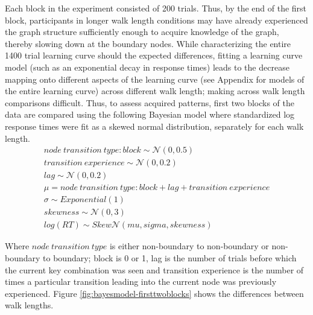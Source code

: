 Each block in the experiment consisted of 200 trials. Thus, by the end of the first block, participants in longer walk length conditions may have already experienced the graph structure sufficiently enough to acquire knowledge of the graph, thereby slowing down at the boundary nodes. While  characterizing the entire 1400 trial learning curve should the expected differences, fitting a learning curve model (such as an exponential decay in response times) leads to the decrease mapping onto different aspects of the learning curve (see Appendix for models of the entire learning curve) across different walk length; making across walk length comparisons difficult.
Thus, to assess acquired patterns, first two blocks of the data are compared using the following Bayesian model where standardized log response times were fit as a skewed normal distribution, separately for each walk length.
\begin{equation}
	\begin{aligned}
		node\ transition\ type : block \sim \mathcal{N}(0, 0.5) \\ 
		transition\ experience \sim \mathcal{N}(0, 0.2) \\  
		lag \sim \mathcal{N}(0, 0.2) \\ 
		\mu = node\ transition\ type : block + lag + transition\ experience \\
		\sigma \sim Exponential(1) \\ 
		skewness \sim \mathcal{N}(0, 3) \\ 
		log(RT) \sim Skew\mathcal{N}(mu, sigma, skewness)
	\end{aligned}
\end{equation} 

Where $node\ transition\ type$ is either non-boundary to non-boundary or non-boundary to boundary; block is 0 or 1, lag is the number of trials before which the current key combination was seen and transition experience is the number of times a particular transition leading into the current node was previously experienced. Figure \ref{fig:bayesmodel-firsttwoblocks} shows the differences between walk lengths. 

